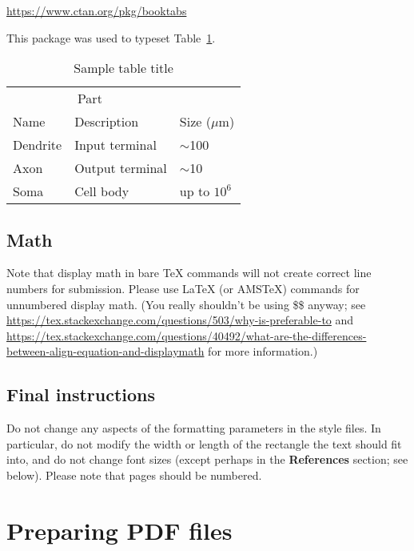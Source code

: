\documentclass{article}
\begin{document}
\begin{center}
    \url{https://www.ctan.org/pkg/booktabs}
\end{center}

This package was used to typeset Table~\ref{sample-table}.

\begin{table} \centering
    \caption{Sample table title} \label{sample-table}
    \begin{tabular}{lll}
        \toprule
        \multicolumn{2}{c}{Part}                   \\
        \cmidrule(r){1-2}
        Name     & Description     & Size ($\mu$m) \\
        \midrule
        Dendrite & Input terminal  & $\sim$100     \\
        Axon     & Output terminal & $\sim$10      \\
        Soma     & Cell body       & up to $10^6$  \\
        \bottomrule
    \end{tabular}
\end{table}

\subsection{Math}

Note that display math in bare TeX commands will not create correct line numbers for submission. Please use LaTeX (or AMSTeX) commands for unnumbered display math. (You really shouldn't be using \$\$ anyway; see \url{https://tex.stackexchange.com/questions/503/why-is-preferable-to} and \url{https://tex.stackexchange.com/questions/40492/what-are-the-differences-between-align-equation-and-displaymath} for more information.)

\subsection{Final instructions}

Do not change any aspects of the formatting parameters in the style files. In particular, do not modify the width or length of the rectangle the text should fit into, and do not change font sizes (except perhaps in the \textbf{References} section; see below). Please note that pages should be numbered.

\section{Preparing PDF files}
\end{document}
